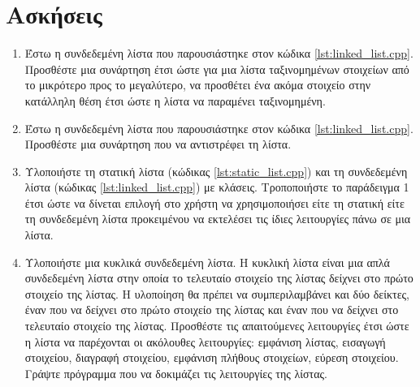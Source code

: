 \section{Ασκήσεις}
\begin{enumerate}
\item Έστω η συνδεδεμένη λίστα που παρουσιάστηκε στον κώδικα \ref{lst:linked_list.cpp}. Προσθέστε μια συνάρτηση έτσι ώστε για  μια λίστα ταξινομημένων στοιχείων από το μικρότερο προς το μεγαλύτερο, να προσθέτει ένα ακόμα στοιχείο στην κατάλληλη θέση έτσι ώστε η λίστα να παραμένει ταξινομημένη.
\item Έστω η συνδεδεμένη λίστα που παρουσιάστηκε στον κώδικα \ref{lst:linked_list.cpp}. Προσθέστε μια συνάρτηση που να αντιστρέφει τη λίστα.
\item Υλοποιήστε τη στατική λίστα (κώδικας \ref{lst:static_list.cpp}) και τη συνδεδεμένη λίστα (κώδικας \ref{lst:linked_list.cpp}) με κλάσεις. Τροποποιήστε το παράδειγμα 1 έτσι ώστε να δίνεται επιλογή στο χρήστη να χρησιμοποιήσει είτε τη στατική είτε τη συνδεδεμένη λίστα προκειμένου να εκτελέσει τις ίδιες λειτουργίες πάνω σε μια λίστα. 
\item Υλοποιήστε μια κυκλικά συνδεδεμένη λίστα. Η κυκλική λίστα είναι μια απλά συνδεδεμένη λίστα στην οποία το τελευταίο στοιχείο της λίστας δείχνει στο πρώτο στοιχείο της λίστας. Η υλοποίηση θα πρέπει να συμπεριλαμβάνει και δύο δείκτες, έναν που να δείχνει στο πρώτο στοιχείο της λίστας και έναν που να δείχνει στο τελευταίο στοιχείο της λίστας. Προσθέστε τις απαιτούμενες λειτουργίες έτσι ώστε η λίστα να παρέχονται οι ακόλουθες λειτουργίες: εμφάνιση λίστας, εισαγωγή στοιχείου, διαγραφή στοιχείου, εμφάνιση πλήθους στοιχείων, εύρεση στοιχείου. Γράψτε πρόγραμμα που να δοκιμάζει τις λειτουργίες της λίστας.
\end{enumerate}

